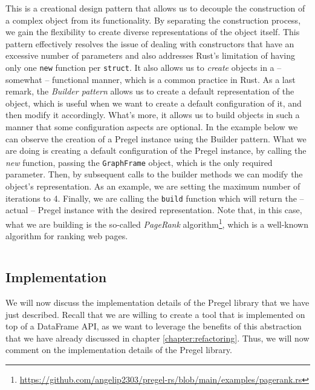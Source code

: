 This is a creational design pattern that allows us to decouple the construction of a complex object from its functionality. By separating the construction process, we gain the flexibility to create diverse representations of the object itself. This pattern effectively resolves the issue of dealing with constructors that have an excessive number of parameters and also addresses Rust's limitation of having only one \texttt{new} function per \texttt{struct}. It also allows us to \textit{create} objects in a -- somewhat -- functional manner, which is a common practice in Rust. As a last remark, the \textit{Builder pattern} allows us to create a default representation of the object, which is useful when we want to create a default configuration of it, and then modify it accordingly. What's more, it allows us to build objects in such a manner that some configuration aspects are optional. In the example below we can observe the creation of a Pregel instance using the Builder pattern. What we are doing is creating a default configuration of the Pregel instance, by calling the \textit{new} function, passing the \texttt{GraphFrame} object, which is the only required parameter. Then, by subsequent calls to the builder methods we can modify the object's representation. As an example, we are setting the maximum number of iterations to 4. Finally, we are calling the \texttt{build} function which will return the -- actual -- Pregel instance with the desired representation. Note that, in this case, what we are building is the so-called \textit{PageRank} algorithm\footnote{\url{https://github.com/angelip2303/pregel-rs/blob/main/examples/pagerank.rs}}, which is a well-known algorithm for ranking web pages.

\begin{code}
    \inputminted{rust}{code/listings/11-3_pagerank.rs}
\end{code}

\subsection{Implementation}

We will now discuss the implementation details of the Pregel library that we have just described. Recall that we are willing to create a tool that is implemented on top of a DataFrame API, as we want to leverage the benefits of this abstraction that we have already discussed in chapter \ref{chapter:refactoring}. Thus, we will now comment on the implementation details of the Pregel library.

